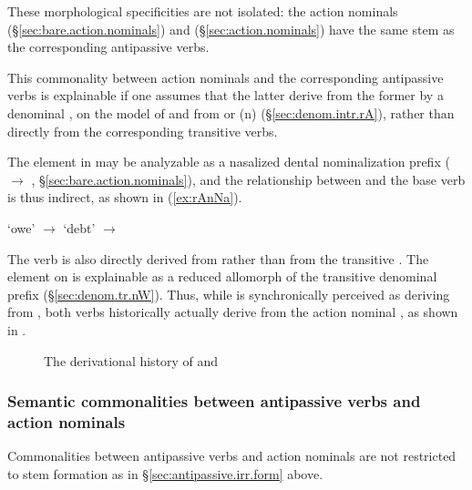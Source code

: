 These morphological specificities are not isolated: the action nominals   (§\ref{sec:bare.action.nominals}) and   (§\ref{sec:action.nominals}) have the same stem as the corresponding antipassive verbs.

This commonality between action nominals and the corresponding antipassive verbs is explainable if one assumes that the latter derive from the former by a denominal , on the model of   and   from  or  (n) (§\ref{sec:denom.intr.rA}), rather than directly from the corresponding transitive verbs.
 
The  element in  may be analyzable as a nasalized dental nominalization prefix ( $\rightarrow$ ,  §\ref{sec:bare.action.nominals}), and the relationship between  and the base verb  is thus indirect, as shown in (\ref{ex:rAnNa}).

\begin{exe}
\ex \label{ex:rAnNa}
\glt {} `owe' $\rightarrow$  `debt' $\rightarrow$ 
\end{exe}
  
The verb  is also directly derived from  rather than from the transitive . The  element on  is explainable as a reduced allomorph of the transitive denominal  prefix (§\ref{sec:denom.tr.nW}). Thus, while  is synchronically perceived as deriving from , both verbs historically actually derive from the action nominal , as shown in . 

   \begin{figure}
   \caption{The derivational history of  and   } \label{fig:ntsGe}  
\end{figure}


\subsubsection{Semantic commonalities between antipassive verbs and action nominals} \label{sec:antipassive.irr.semantic} 
Commonalities between antipassive verbs and action nominals are not restricted to stem formation as in  §\ref{sec:antipassive.irr.form}  above.

